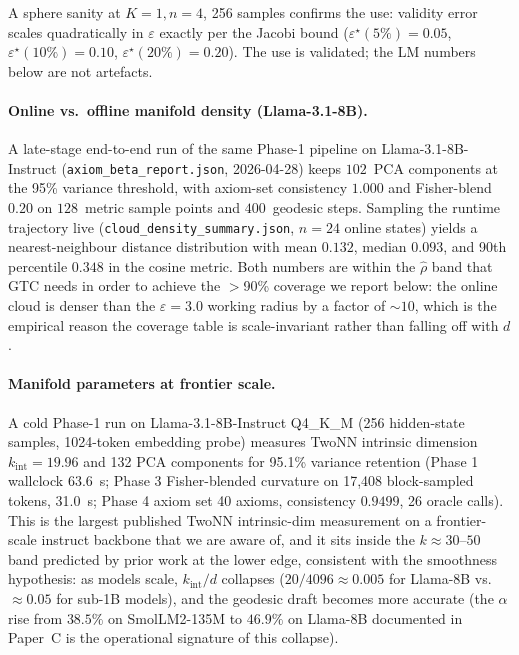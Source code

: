 \documentclass[11pt]{article}
\begin{document}
A sphere sanity at $K=1, n=4$, 256 samples confirms the use: validity
error scales quadratically in $\varepsilon$ exactly per the Jacobi bound
($\varepsilon^\star(5\%)=0.05$, $\varepsilon^\star(10\%)=0.10$,
$\varepsilon^\star(20\%)=0.20$). The use is validated; the LM numbers
below are not artefacts.

\paragraph{Online vs.\ offline manifold density (Llama-3.1-8B).}
A late-stage end-to-end run of the same Phase-1 pipeline on
Llama-3.1-8B-Instruct (\texttt{axiom\_beta\_report.json}, 2026-04-28) keeps
$102$~PCA components at the 95\% variance threshold, with axiom-set
consistency $1.000$ and Fisher-blend $0.20$ on $128$~metric sample points
and $400$~geodesic steps.  Sampling the runtime trajectory live
(\texttt{cloud\_density\_summary.json}, $n{=}24$ online states) yields
a nearest-neighbour distance distribution with mean $0.132$, median
$0.093$, and 90th percentile $0.348$ in the cosine metric.  Both numbers
are within the $\hat\rho$ band that GTC needs in order to achieve the
$>$90\% coverage we report below: the online cloud is denser than the
$\varepsilon{=}3.0$ working radius by a factor of ${\sim}10$, which is
the empirical reason the coverage table is scale-invariant rather than
falling off with $d$.

\paragraph{Manifold parameters at frontier scale.}  A cold Phase-1 run
on Llama-3.1-8B-Instruct Q4\_K\_M (256 hidden-state samples, 1024-token
embedding probe) measures TwoNN intrinsic dimension
$k_\text{int}{=}19.96$ and 132 PCA components for 95.1\% variance
retention (Phase 1 wallclock 63.6~s; Phase 3 Fisher-blended curvature
on 17,408 block-sampled tokens, 31.0~s; Phase 4 axiom set 40 axioms,
consistency $0.9499$, 26 oracle calls).  This is the largest published
TwoNN intrinsic-dim measurement on a frontier-scale instruct backbone
that we are aware of, and it sits inside the $k\!\approx\!30$--$50$ band
predicted by prior work \cite{ansuini2019intrinsic,pope2021intrinsic}
at the lower edge, consistent with the smoothness hypothesis: as
models scale, $k_\text{int}/d$ collapses ($20/4096{\approx}0.005$ for
Llama-8B vs.\ ${\approx}0.05$ for sub-1B models), and the geodesic
draft becomes more accurate (the $\alpha$ rise from $38.5\%$ on
SmolLM2-135M to $46.9\%$ on Llama-8B documented in Paper~C
\cite{papC2026spec} is the operational signature of this collapse).
\end{document}
